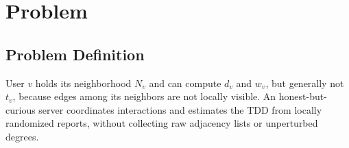 \section{Problem}
\label{sec:problem}

\subsection{Problem Definition}
\label{subsec:problem-formulation}

 User $v$ holds its neighborhood $N_v$ and can compute $d_v$ and $w_v$, but generally not $t_v$, because edges among its neighbors are not locally visible. An honest-but-curious server coordinates interactions and estimates the TDD from locally randomized reports, without collecting raw adjacency lists or unperturbed degrees.



